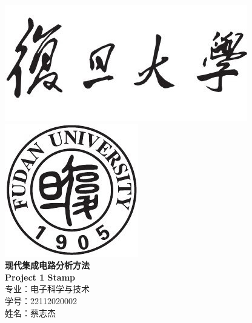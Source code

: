 \documentclass[12pt]{article}
\newcommand{\hmwkTitle}{Project 1 Stamp}
\newcommand{\hmwkAuthorName}{姓名：蔡志杰 }
\newcommand{\hmwMajor}{专业：电子科学与技术}
\newcommand{\hmwNumber}{学号：22112020002}
\begin{document}
\begin{titlepage}
\begin{center}



\includegraphics[scale = 0.9]{fudan.jpg}\\
\includegraphics[scale = 0.6]{fudan_logo.jpg}\\
\vspace{0.5in}
\linespread{1.9}\huge {\bfseries 现代集成电路分析方法}\\
\linespread{1.9}\LARGE {\bfseries \textbf{\hmwkTitle}}\\
\vspace{1.0in}
\large \hmwMajor{}\\
\large \hmwNumber{}\\
\large \hmwkAuthorName{}\\

\end{center}
\end{titlepage}
\newpage
\end{document}
